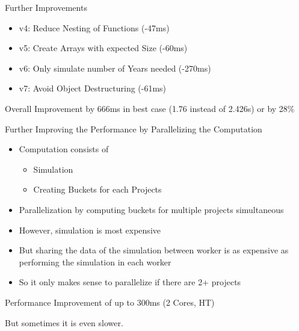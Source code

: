 \begin{frame}{Further Improvements}
	\begin{itemize}
		\item v4: Reduce Nesting of Functions (-47ms)
		\item v5: Create Arrays with expected Size (-60ms)
		\item v6: Only simulate number of Years needed (-270ms)
		\item v7: Avoid Object Destructuring (-61ms)
	\end{itemize}
	
	\begin{block}{Overall}
		Improvement by 666ms in best case (1.76 instead of 2.426s) or by 28\%
	\end{block}

\end{frame}

\begin{frame}{Further Improving the Performance by Parallelizing the Computation}
	\begin{itemize}[<+->]
		\item Computation consists of
			\begin{itemize}
				\item Simulation
				\item Creating Buckets for each Projects
			\end{itemize}
		\item Parallelization by computing buckets for multiple projects simultaneous 
		\item However, simulation is most expensive
		\item But sharing the data of the simulation between worker is as expensive as performing the simulation in each worker
		\item So it only makes sense to parallelize if there are 2+ projects
	\end{itemize}
	

\end{frame}

\begin{frame}{Performance Improvement of up to 300ms (2 Cores, HT)}

But sometimes it is even slower.

\end{frame}
